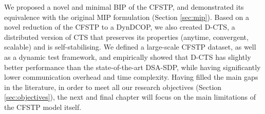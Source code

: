 We proposed a novel and minimal BIP of the CFSTP, and demonstrated its equivalence with
the original MIP formulation (Section \ref{sec:mip}). Based on a novel reduction of the
CFSTP to a DynDCOP, we also created D-CTS, a distributed version of CTS that preserves its
properties (anytime, convergent, scalable) and is self-stabilising. We defined a
large-scale CFSTP dataset, as well as a dynamic test framework, and empirically showed
that D-CTS has slightly better performance than the state-of-the-art DSA-SDP, while having
significantly lower communication overhead and time complexity. Having filled the main
gaps in the literature, in order to meet all our research objectives (Section
\ref{sec:objectives}), the next and final chapter will focus on the main limitations of
the CFSTP model itself.
